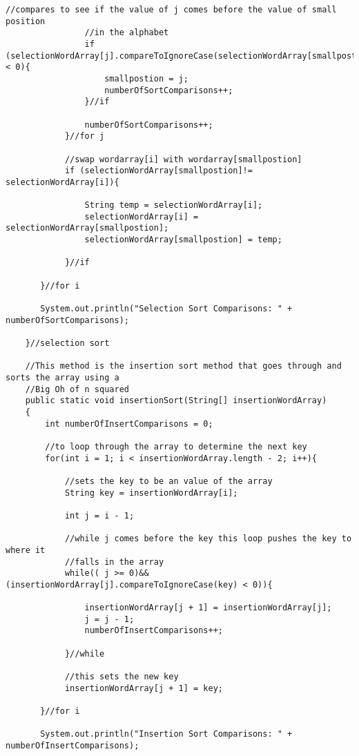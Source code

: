 \documentclass[letterpaper, 10pt,DIV=13]{scrartcl}
\numberwithin{equation}{section} %
\numberwithin{figure}{section} %
\numberwithin{table}{section} %
\begin{document}
\begin{lstlisting}[frame=single, ]
                //compares to see if the value of j comes before the value of small position 
                //in the alphabet
                if (selectionWordArray[j].compareToIgnoreCase(selectionWordArray[smallpostion]) < 0){
                    smallpostion = j;
                    numberOfSortComparisons++;
                }//if

                numberOfSortComparisons++;
            }//for j

            //swap wordarray[i] with wordarray[smallpostion]
            if (selectionWordArray[smallpostion]!= selectionWordArray[i]){
                
                String temp = selectionWordArray[i];
                selectionWordArray[i] = selectionWordArray[smallpostion];
                selectionWordArray[smallpostion] = temp;

            }//if

       }//for i 

       System.out.println("Selection Sort Comparisons: " + numberOfSortComparisons);

    }//selection sort

    //This method is the insertion sort method that goes through and sorts the array using a
    //Big Oh of n squared
    public static void insertionSort(String[] insertionWordArray)
    {
        int numberOfInsertComparisons = 0;

        //to loop through the array to determine the next key
        for(int i = 1; i < insertionWordArray.length - 2; i++){

            //sets the key to be an value of the array
            String key = insertionWordArray[i];

            int j = i - 1;
            
            //while j comes before the key this loop pushes the key to where it 
            //falls in the array
            while(( j >= 0)&&(insertionWordArray[j].compareToIgnoreCase(key) < 0)){

                insertionWordArray[j + 1] = insertionWordArray[j];
                j = j - 1;
                numberOfInsertComparisons++;

            }//while

            //this sets the new key
            insertionWordArray[j + 1] = key;

       }//for i 

       System.out.println("Insertion Sort Comparisons: " + numberOfInsertComparisons);
       

\end{lstlisting}
\end{document}
